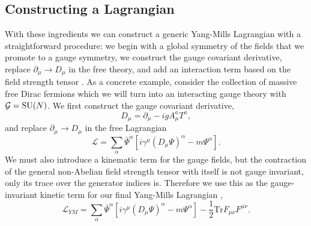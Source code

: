 \subsection{Constructing a Lagrangian}
With these ingredients we can construct a generic Yang-Mills Lagrangian with a straightforward procedure: we begin with a global symmetry of the fields that we promote to a gauge symmetry, we construct the gauge covariant derivative, replace $\partial_{\mu} \rightarrow D_{\mu}$ in the free theory, and add an interaction term based on the field strength tensor \cite{PeskinSchroeder}. 
As a concrete example, consider the collection of massive free Dirac fermions which we will turn into an interacting gauge theory with $\mathcal{G} = {\mathrm{SU}(N)}$.
We first construct the gauge covariant derivative, 
\begin{equation}
    \label{eq:theory:generic_SUN_Dmu}
    D_{\mu} = \partial_{\mu} - igA_{\mu}^{a} T^{a},
\end{equation}
and replace $\partial_{\mu} \rightarrow D_{\mu}$ in the free Lagrangian
\begin{equation}
    \label{eq:theory:int_dirac_no_gauge_dynamics}
    \mathcal{L} = \sum_{\alpha} \bar{\Psi}^{\alpha}[i\gamma^{\mu}(D_{\mu}\Psi)^{\alpha} - m\Psi^{\alpha}].
\end{equation}
We must also introduce a kinematic term for the gauge fields, but the contraction of the general non-Abelian field strength tensor with itself is not gauge invariant, only its trace over the generator indices is. 
Therefore we use this as the gauge-invariant kinetic term for our final Yang-Mills Lagrangian \cite{PeskinSchroeder},
\begin{equation}
    \label{eq:theory:int_dirac_gauge_dynamics}
    \mathcal{L}_{YM} = \sum_{\alpha} \bar{\Psi}^{\alpha}[i\gamma^{\mu}(D_{\mu}\Psi)^{\alpha} - m\Psi^{\alpha}] - \frac{1}{2}\mathrm{Tr}F_{\mu\nu}F^{\mu\nu}.
\end{equation}
%
%

